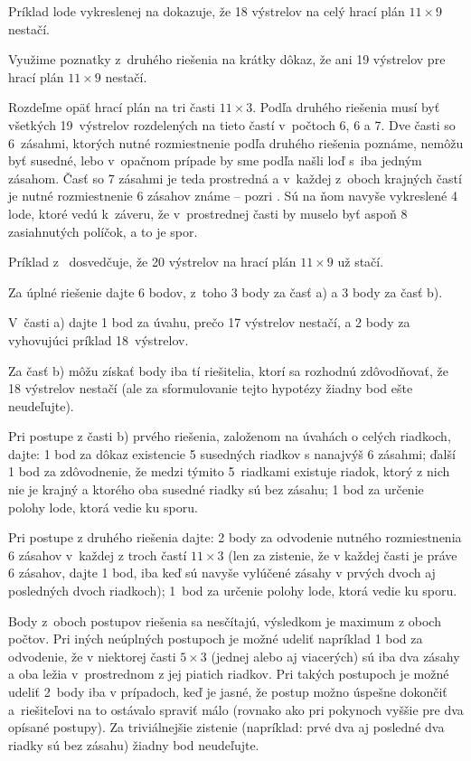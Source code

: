 {Príklad lode vykreslenej na 
dokazuje, že 18 výstrelov na celý hrací plán $11\times9$ nestačí.

\Pozn
Využime poznatky z~druhého riešenia na krátky dôkaz,
že ani 19 výstrelov pre hrací plán $11\times9$ nestačí.

Rozdeľme opäť hrací plán na tri časti $11\times3$. Podľa druhého
riešenia musí byť všetkých 19~výstrelov rozdelených na tieto častí v~počtoch
6, 6 a 7. Dve časti so 6~zásahmi, ktorých nutné rozmiestnenie podľa druhého
riešenia poznáme, nemôžu byť susedné, lebo
v~opačnom prípade by sme podľa  našli loď
s~iba jedným zásahom. Časť so 7 zásahmi je teda prostredná a
v~každej z~oboch krajných častí je nutné rozmiestnenie 6 zásahov známe --
pozri \obr. Sú na
ňom navyše vykreslené 4 lode, ktoré vedú k~záveru, že
v~prostrednej časti by muselo byť aspoň 8 zasiahnutých políčok, a to
je spor.
%

Príklad z~\obr{} dosvedčuje, že 20 výstrelov na hrací plán
$11\times9$ už stačí.


\schemaABC
Za úplné riešenie dajte 6 bodov, z~toho 3 body za časť a) a 3 body
za časť b).

V~časti a) dajte 1 bod za úvahu, prečo 17 výstrelov nestačí, a 2
body za vyhovujúci príklad 18~výstrelov.

Za časť b) môžu získať body iba tí riešitelia, ktorí sa
rozhodnú zdôvodňovať, že 18 výstrelov nestačí (ale za sformulovanie
tejto hypotézy žiadny bod ešte neudeľujte).

Pri postupe z časti b) prvého riešenia,
založenom na úvahách o celých riadkoch, dajte:
1 bod za dôkaz existencie 5 susedných riadkov s nanajvýš 6 zásahmi;
ďalší 1 bod za zdôvodnenie, že medzi týmito 5~riadkami existuje riadok,
ktorý z nich nie je krajný a ktorého oba susedné riadky sú bez zásahu;
1 bod za určenie polohy lode, ktorá vedie ku sporu.

Pri postupe z druhého riešenia dajte: 2 body za odvodenie
nutného rozmiestnenia 6 zásahov v~každej z troch častí $11\times3$
(len za zistenie, že v každej časti je práve 6 zásahov, dajte 1 bod,
iba keď sú navyše vylúčené zásahy v prvých dvoch aj
posledných dvoch riadkoch);
1~bod za určenie polohy lode, ktorá vedie ku sporu.

Body z~oboch postupov riešenia sa nesčítajú, výsledkom je maximum z
oboch počtov. Pri iných neúplných postupoch je možné udeliť
napríklad 1 bod za odvodenie, že v niektorej časti $5\times3$
(jednej alebo aj viacerých) sú iba dva zásahy a oba ležia
v~prostrednom z jej piatich riadkov. Pri takých postupoch je možné
udeliť 2~body iba v prípadoch, keď je
jasné, že postup možno úspešne dokončiť a~riešiteľovi na to ostávalo
spraviť málo (rovnako ako pri pokynoch vyššie pre dva opísané
postupy). Za triviálnejšie zistenie
(napríklad: prvé dva aj posledné dva riadky sú bez zásahu)
žiadny bod neudeľujte.
\endschema

}

